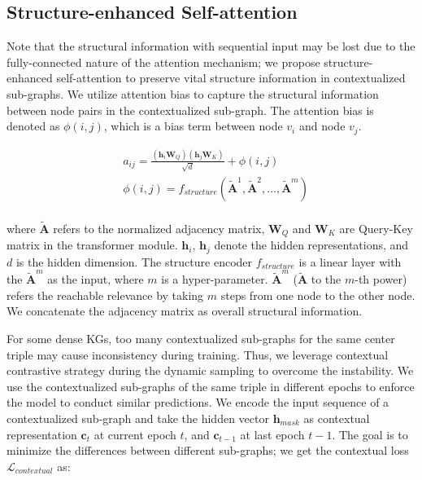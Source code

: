 \documentclass[sigconf]{acmart}
\begin{document}
\subsection{Structure-enhanced Self-attention}
\label{sec:Structural_bias}


Note that the structural information with sequential input may be lost due to the fully-connected nature of the attention mechanism; we propose structure-enhanced self-attention to preserve vital structure information in contextualized sub-graphs.
We utilize attention bias to capture the structural information between node pairs in the contextualized sub-graph.
The attention bias is denoted as $ \phi(i, j)$, which is a bias term between node $v_i$ and node $v_j$.

\begin{equation}
\begin{aligned}
    & a_{ij}=\frac{(\boldsymbol{h}_{i}\mathbf{W}_{Q})(\boldsymbol{h}_{j}\mathbf{W}_{K})}{\sqrt{d}}+\phi{(i,j)} \\
    & \phi{(i,j)} = f_{structure}(\widetilde{\mathbf{A}}^1, \widetilde{\mathbf{A}}^2, ..., \widetilde{\mathbf{A}}^m) \\
\end{aligned}
\end{equation}

where $\widetilde{\mathbf{A}}$ refers to the normalized adjacency matrix, 
{$\mathbf{W}_{Q}$ and $\mathbf{W}_{K}$ are  Query-Key matrix in the transformer module}. 
$\boldsymbol{h}_{i}$, $\boldsymbol{h}_{j}$ denote the hidden representations, {and $d$ is the hidden dimension.} 
The structure encoder $f_{structure}$ is a linear layer with the  $\widetilde{\mathbf{A}}^m$ as the input, where $m$ is a hyper-parameter.
$\widetilde{\mathbf{A}}^m$ ($\widetilde{\mathbf{A}}$ to the $m$-th power) refers the reachable relevance by taking $m$ steps from one node to the other node.
{We concatenate the adjacency matrix as overall structural information.}

For some dense KGs, too many contextualized sub-graphs for the same center triple may cause inconsistency during training.
Thus, we leverage contextual contrastive strategy during the dynamic sampling to overcome the instability.
We use the contextualized sub-graphs of the same triple in different epochs to enforce the model to conduct similar predictions.
We encode the input sequence of a contextualized sub-graph and take the hidden vector $\boldsymbol{h}_{mask}$ as contextual representation $\boldsymbol{c}_t$ at current epoch $t$, and $\boldsymbol{c}_{t-1}$ at last epoch $t-1$. The goal is to minimize the differences between different sub-graphs; we get the contextual loss $\mathcal{L}_{contextual}$ as:
\end{document}
